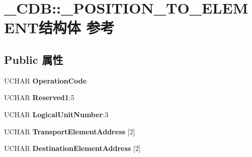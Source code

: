 \hypertarget{struct___c_d_b_1_1___p_o_s_i_t_i_o_n___t_o___e_l_e_m_e_n_t}{}\section{\+\_\+\+C\+DB\+:\+:\+\_\+\+P\+O\+S\+I\+T\+I\+O\+N\+\_\+\+T\+O\+\_\+\+E\+L\+E\+M\+E\+N\+T结构体 参考}
\label{struct___c_d_b_1_1___p_o_s_i_t_i_o_n___t_o___e_l_e_m_e_n_t}
\subsection*{Public 属性}
\begin{DoxyCompactItemize}
\item 
\mbox{\label{struct___c_d_b_1_1___p_o_s_i_t_i_o_n___t_o___e_l_e_m_e_n_t_abd15f32e2917130abf6be2b3a516c366}} 
U\+C\+H\+AR {\bfseries Operation\+Code}
\item 
\mbox{\label{struct___c_d_b_1_1___p_o_s_i_t_i_o_n___t_o___e_l_e_m_e_n_t_ab8881eafb60f5451a03b63e4fab91a54}} 
U\+C\+H\+AR {\bfseries Reserved1}\+:5
\item 
\mbox{\label{struct___c_d_b_1_1___p_o_s_i_t_i_o_n___t_o___e_l_e_m_e_n_t_a9399e0cf470f81e6f02eebba6d677407}} 
U\+C\+H\+AR {\bfseries Logical\+Unit\+Number}\+:3
\item 
\mbox{\label{struct___c_d_b_1_1___p_o_s_i_t_i_o_n___t_o___e_l_e_m_e_n_t_a90e8e4fdef50ed9ad14b6c317e311165}} 
U\+C\+H\+AR {\bfseries Transport\+Element\+Address} \mbox{[}2\mbox{]}
\item 
\mbox{\label{struct___c_d_b_1_1___p_o_s_i_t_i_o_n___t_o___e_l_e_m_e_n_t_ae33ddac07b866dd57679fed58131e181}} 
U\+C\+H\+AR {\bfseries Destination\+Element\+Address} \mbox{[}2\mbox{]}
\item 
\mbox{\label{struct___c_d_b_1_1___p_o_s_i_t_i_o_n___t_o___e_l_e_m_e_n_t_aa52de05ec63ba5014986e07e7595b38f}} 

\end{DoxyCompactItemize}
